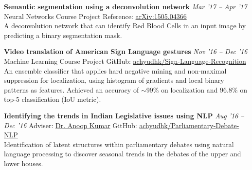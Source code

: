 \documentclass[10pt]{article}
\newcommand{\halfblankline}{\quad\vspace{-0.5\baselineskip}\pagebreak[3]}
\begin{document}
\halfblankline

\textbf{Semantic segmentation using a deconvolution network} \hfill \emph{Mar '17 -- Apr '17}\\
Neural Networks Course Project \hfill Reference: \href{https://arxiv.org/abs/1505.04366}{arXiv:1505.04366}
\vspace{0.5mm} \\
A deconvolution network that can identify Red Blood Cells in an input image by predicting a binary segmentation mask.

\halfblankline

\textbf{Video translation of American Sign Language gestures} \hfill \emph{Nov '16 -- Dec '16} \\
Machine Learning Course Project \hfill GitHub: \href{https://github.com/achyudhk/Sign-Language-Recognition}{achyudhk/Sign-Language-Recognition}
\vspace{0.5mm} \\
An ensemble classifier that applies hard negative mining and non-maximal suppression for localization, using histogram of gradients and local binary patterns as features. Achieved an accuracy of $\sim$99\% on localization and 96.8\% on top-5 classification (IoU metric).

\halfblankline

\textbf{Identifying the trends in Indian Legislative issues using NLP} \hfill \emph{Aug '16 -- Dec '16}
Adviser: \href{http://universe.bits-pilani.ac.in/goa/anoopk/Profile}{Dr. Anoop Kumar} \hfill GitHub: \href{https://github.com/achyudhk/Parliamentary-Debate-NLP}{achyudhk/Parliamentary-Debate-NLP} \\
Identification of latent structures within parliamentary debates using natural language processing to discover seasonal trends in the debates of the upper and lower houses.

\halfblankline
\end{document}
